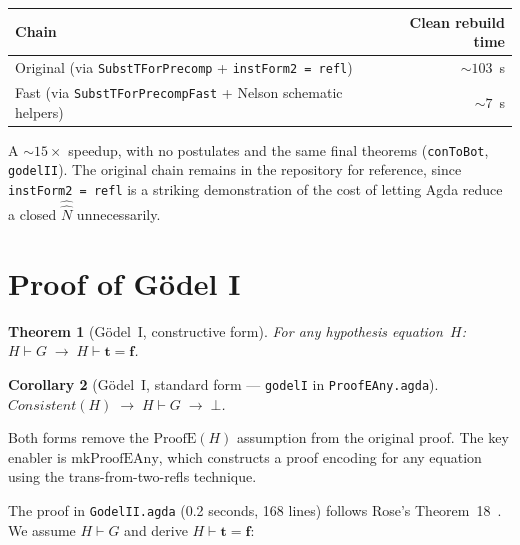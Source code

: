 \documentclass[11pt]{article}
\newtheorem{theorem}{Theorem}
\newtheorem{corollary}[theorem]{Corollary}
\newcommand{\trueT}{\mathbf{t}}
\newcommand{\falseT}{\mathbf{f}}
\newcommand{\reify}[1]{\widehat{#1}}
\begin{document}
\begin{center}
\begin{tabular}{lr}
\hline
\textbf{Chain} & \textbf{Clean rebuild time} \\
\hline
Original (via \texttt{SubstTForPrecomp} + \texttt{instForm2 = refl}) & ${\sim}103$~s \\
Fast (via \texttt{SubstTForPrecompFast} + Nelson schematic helpers) & ${\sim}7$~s \\
\hline
\end{tabular}
\end{center}

\noindent
A ${\sim}15{\times}$ speedup, with no postulates and the same
final theorems (\texttt{conToBot}, \texttt{godelII}).  The
original chain remains in the repository for reference, since
\texttt{instForm2 = refl} is a striking demonstration of the
cost of letting Agda reduce a closed
$\reify{\hat{N}}$ unnecessarily.

\section{Proof of G\"odel I}
\label{sec:godelI}

\begin{theorem}[G\"odel~I, constructive form]
\label{thm:godel1cf}
For any hypothesis equation~$H$:
$H \vdash G \;\to\; H \vdash \trueT = \falseT$.
\end{theorem}

\begin{corollary}[G\"odel~I, standard form --- \texttt{godelI} in \texttt{ProofEAny.agda}]
\label{thm:godel1s}
$\mathit{Consistent}(H) \;\to\; H \vdash G \;\to\; \bot$.
\end{corollary}

\noindent
Both forms remove the $\mathrm{ProofE}(H)$ assumption
from the original proof.  The key enabler is
$\mathrm{mkProofEAny}$, which constructs a proof encoding
for any equation using the trans-from-two-refls technique.

\medskip\noindent
The proof in \texttt{GodelII.agda} (0.2 seconds, 168 lines)
follows Rose's Theorem~18~\cite{rose1961}.
We assume $H \vdash G$ and derive $H \vdash \trueT = \falseT$:
\end{document}
